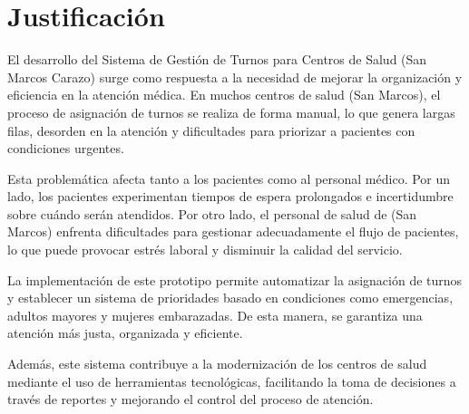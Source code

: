 \section{Justificación}

El desarrollo del Sistema de Gestión de Turnos para Centros de Salud (San Marcos Carazo) surge como respuesta a la necesidad de mejorar la organización y eficiencia en la atención médica. En muchos centros de salud (San Marcos), el proceso de asignación de turnos se realiza de forma manual, lo que genera largas filas, desorden en la atención y dificultades para priorizar a pacientes con condiciones urgentes.

Esta problemática afecta tanto a los pacientes como al personal médico. Por un lado, los pacientes experimentan tiempos de espera prolongados e incertidumbre sobre cuándo serán atendidos. Por otro lado, el personal de salud de (San Marcos) enfrenta dificultades para gestionar adecuadamente el flujo de pacientes, lo que puede provocar estrés laboral y disminuir la calidad del servicio.

La implementación de este prototipo permite automatizar la asignación de turnos y establecer un sistema de prioridades basado en condiciones como emergencias, adultos mayores y mujeres embarazadas. De esta manera, se garantiza una atención más justa, organizada y eficiente.

Además, este sistema contribuye a la modernización de los centros de salud mediante el uso de herramientas tecnológicas, facilitando la toma de decisiones a través de reportes y mejorando el control del proceso de atención.
